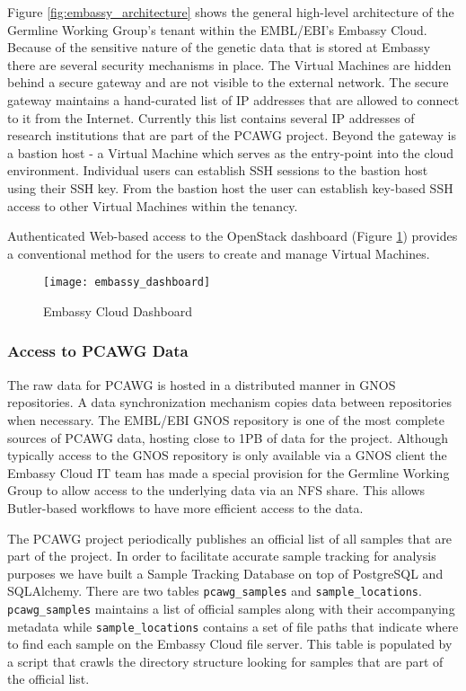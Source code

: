 Figure \ref{fig:embassy_architecture} shows the general high-level architecture of the Germline Working Group's tenant within the EMBL/EBI's Embassy Cloud. Because of the sensitive nature of the genetic data that is stored at Embassy there are several security mechanisms in place. The Virtual Machines are hidden behind a secure gateway and are not visible to the external network. The secure gateway maintains a hand-curated list of IP addresses that are allowed to connect to it from the Internet. Currently this list contains several IP addresses of research institutions that are part of the PCAWG project. Beyond the gateway is a bastion host - a Virtual Machine which serves as the entry-point into the cloud environment. Individual users can establish SSH sessions to the bastion host using their SSH key. From the bastion host the user can establish key-based SSH access to other Virtual Machines within the tenancy. 

Authenticated Web-based access to the OpenStack dashboard (Figure \ref{fig:embassy_dashboard}) provides a conventional method for the users to create and manage Virtual Machines.

\begin{figure}[H]
\texttt{[image: embassy\_dashboard]}
\centering
\caption {Embassy Cloud Dashboard}
\label{fig:embassy_dashboard}
\end{figure}

\subsubsection{Access to PCAWG Data}
\label{sec:pcawg_data_access}

The raw data for PCAWG is hosted in a distributed manner in GNOS repositories. A data synchronization mechanism copies data between repositories when necessary. The EMBL/EBI GNOS repository is one of the most complete sources of PCAWG data, hosting close to 1PB of data for the project. Although typically access to the GNOS repository is only available via a GNOS client the Embassy Cloud IT team has made a special provision for the Germline Working Group to allow access to the underlying data via an NFS share. This allows Butler-based workflows to have more efficient access to the data.

The PCAWG project periodically publishes an official list of all samples that are part of the project. In order to facilitate accurate sample tracking for analysis purposes we have built a Sample Tracking Database on top of PostgreSQL and SQLAlchemy. There are two tables \texttt{pcawg_samples} and \texttt{sample_locations}. \texttt{pcawg_samples} maintains a list of official samples along with their accompanying metadata while \texttt{sample_locations} contains a set of file paths that indicate where to find each sample on the Embassy Cloud file server. This table is populated by a script that crawls the directory structure looking for samples that are part of the official list.

